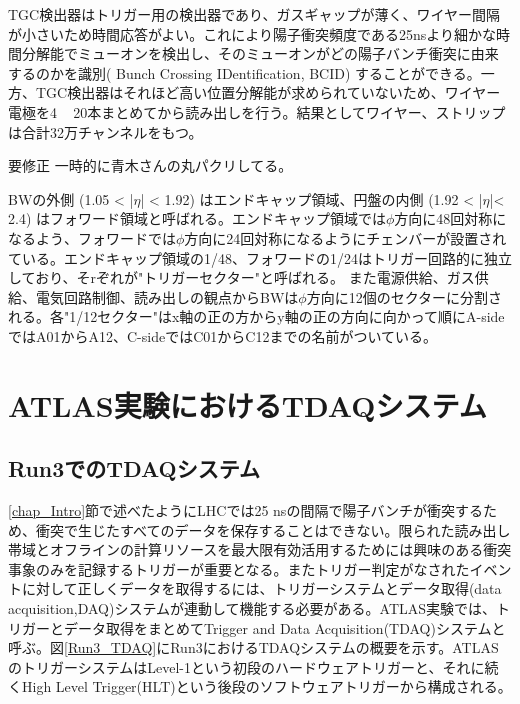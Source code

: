 TGC検出器はトリガー用の検出器であり、ガスギャップが薄く、ワイヤー間隔が小さいため時間応答がよい。これにより陽子衝突頻度である25nsより細かな時間分解能でミューオンを検出し、そのミューオンがどの陽子バンチ衝突に由来するのかを識別( Bunch Crossing IDentification, BCID) することができる。一方、TGC検出器はそれほど高い位置分解能が求められていないため、ワイヤー電極を4 ~ 20本まとめてから読み出しを行う。結果としてワイヤー、ストリップは合計32万チャンネルをもつ。

\begin{itembox}{要修正}
    一時的に青木さんの丸パクリしてる。
\end{itembox}

BWの外側 (1.05 < |$\eta$| < 1.92) はエンドキャップ領域、円盤の内側 (1.92 < |$\eta$|< 2.4) はフォワード領域と呼ばれる。エンドキャップ領域では$\phi$方向に48回対称になるよう、フォワードでは$\phi$方向に24回対称になるようにチェンバーが設置されている。エンドキャップ領域の1/48、フォワードの1/24はトリガー回路的に独立しており、そrぞれが"トリガーセクター"と呼ばれる。
また電源供給、ガス供給、電気回路制御、読み出しの観点からBWは$\phi$方向に12個のセクターに分割される。各"1/12セクター"はx軸の正の方からy軸の正の方向に向かって順にA-sideではA01からA12、C-sideではC01からC12までの名前がついている。

\section{ATLAS実験におけるTDAQシステム}
\label{sec_TDAQ}
   
    \subsection{Run3でのTDAQシステム}
    \label{subsec_run3TDAQ}
    \ref{chap_Intro}節で述べたようにLHCでは25 nsの間隔で陽子バンチが衝突するため、衝突で生じたすべてのデータを保存することはできない。限られた読み出し帯域とオフラインの計算リソースを最大限有効活用するためには興味のある衝突事象のみを記録するトリガーが重要となる。またトリガー判定がなされたイベントに対して正しくデータを取得するには、トリガーシステムとデータ取得(data acquisition,DAQ)システムが連動して機能する必要がある。ATLAS実験では、トリガーとデータ取得をまとめてTrigger and Data Acquisition(TDAQ)システムと呼ぶ。図\ref{Run3_TDAQ}にRun3におけるTDAQシステムの概要を示す。ATLASのトリガーシステムはLevel-1という初段のハードウェアトリガーと、それに続くHigh Level Trigger(HLT)という後段のソフトウェアトリガーから構成される。

